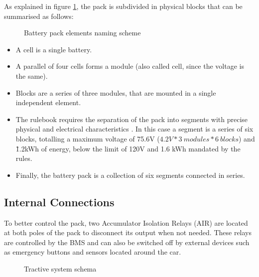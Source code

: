 As explained in figure \ref{fig:naming}, the pack is subdivided in physical blocks that can be summarised as follows:
\begin{figure}[h]
    \centering
    
    \caption{Battery pack elements naming scheme}
    \label{fig:naming}
\end{figure}

\begin{itemize}
    \item A cell is a single battery.
    \item A parallel of four cells forms a module (also called cell, since the voltage is the same).
    \item Blocks are a series of three modules, that are mounted in a single independent element.
    \item The rulebook requires the separation of the pack into segments with precise physical and electrical characteristics \cite[EV 5.3.2]{fsg2020}. In this case a segment is a series of six blocks, totalling a maximum voltage of 75.6V ($4.2V*3\ modules*6\ blocks$) and \~1.2kWh of energy, below the limit of 120V and 1.6 kWh mandated by the rules.
    \item Finally, the battery pack is a collection of six segments connected in series.
\end{itemize}

\subsection{Internal Connections}
To better control the pack, two Accumulator Isolation Relays (AIR) \cite[EV 5.6]{fsg2020} are located at both poles of the pack to disconnect its output when not needed. These relays are controlled by the BMS and can also be switched off by external devices such as emergency buttons and sensors located around the car.
\begin{figure}[h]
    \centering
    
    \caption{Tractive system schema}
    \label{fig:tractive_system_detail}
\end{figure}

